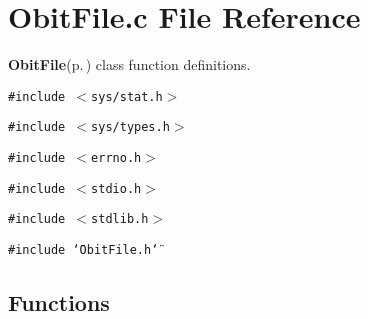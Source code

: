 \section{Obit\-File.c File Reference}
\label{ObitFile_8c}
{\bf Obit\-File}{\rm (p.\,\pageref{structObitFile})} class function definitions. 

{\tt \#include $<$sys/stat.h$>$}\par
{\tt \#include $<$sys/types.h$>$}\par
{\tt \#include $<$errno.h$>$}\par
{\tt \#include $<$stdio.h$>$}\par
{\tt \#include $<$stdlib.h$>$}\par
{\tt \#include \char`\"{}Obit\-File.h\char`\"{}}\par
\subsection*{Functions}
